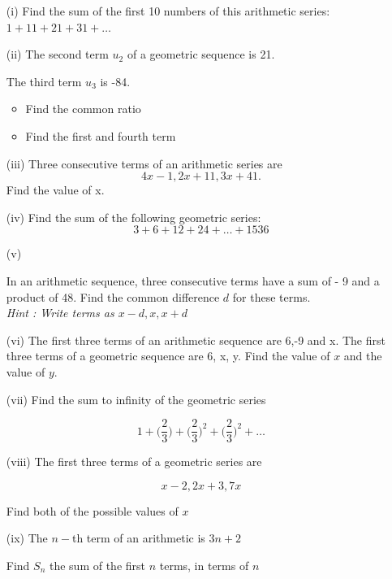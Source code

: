 \documentclass[]{article}
\begin{document}
\begin{enumerate}
	\item[(i)] Find the sum of the first 10 numbers of this arithmetic series: $1 + 11 + 21 + 31 + \ldots$
	
	\item[(ii)] 
	The second term $u_2$ of a geometric sequence is 21.
	
	The third term $u_3$ is -84.
	\begin{itemize}
		\item Find the common ratio 
		\item Find the first and fourth term
	\end{itemize}
	
	\item[(iii)] Three consecutive terms of an arithmetic series are \[4x - 1, 2x +11, 3x + 41. \]
	Find the value of x.
	
	\item[(iv)] Find the sum of the following geometric series: 
	\[3 + 6 + 12 + 24 + \ldots + 1536\]
	
	\item[(v)] 
	
	In an arithmetic sequence, three consecutive terms have a sum of - 9 and a product of 48.
	Find the common difference $d$ for these terms.
	\\
	\textit{\textit{Hint : Write terms as $x-d,x,x+d$}}
	\item[(vi)]
	The first three terms of an arithmetic sequence are 6,-9 and x.
	The first three terms of a geometric sequence are 6, x, y.
	Find the value of $x$ and the value of $y$.
	
	\item[(vii)]
	Find the sum to infinity of the geometric series
	
	\[ 1 + \bigg(\frac{2}{3}\bigg) + \bigg(\frac{2}{3}\bigg)^2 + \bigg(\frac{2}{3}\bigg)^2 + \ldots \]
	\item[(viii)]
	The first three terms of a geometric series are
	
	\[ x-2 , 2x+3, 7x \]
	
	Find both of the possible values of $x$
	
	
	\item[(ix)]
	The $n-$th term of an arithmetic is $3n+2$
	
	Find $S_n$ the sum of the first $n$ terms, in terms of $n$
\end{enumerate}
\newpage
\end{document}
